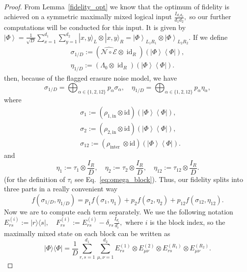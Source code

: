 \documentclass[11pt,letterpaper]{article}
\theoremstyle{plain}
\theoremstyle{plain}
\theoremstyle{plain}
\theoremstyle{plain}
\theoremstyle{plain}
\theoremstyle{plain}
\theoremstyle{plain}
\theoremstyle{definition}
\theoremstyle{plain}
\begin{document}
\begin{proof}
From Lemma~\ref{fidelity_opt} we know that the optimum of fidelity is achieved on a symmetric maximally mixed logical input
$
    \frac{I_{d_1 d_2}}{d_1 d_2},
$
so our further computations will be conducted for this input. 
It is given by
$
    \left|\Phi\right\rangle=\frac{1}{\sqrt{D}} \sum_{x=1}^{d_1} \sum_{y=1}^{d_2}|x, y\rangle_L \otimes|x, y\rangle_R=\left|\Phi\right\rangle_{L_1 R_1} \otimes\left|\Phi\right\rangle_{L_2 R_2}.
$
If we define
\[
    \begin{gathered}
    \sigma_{1/D}:=\left(\widehat{\mathcal{N} \circ \mathcal{E}} \otimes \operatorname{id}_R\right)\left(\left|\Phi\right\rangle\left\langle\Phi\right|\right), \\
    \eta_{1/D}:=\left(\Lambda_0 \otimes \operatorname{id}_R\right)\left(\left|\Phi\right\rangle\left\langle\Phi\right|\right) .
    \end{gathered}
\]
then, because of the flagged erasure noise model, we have
\[
    \sigma_{1/D}=\bigoplus_{\alpha \in\{1,2,12\}} p_\alpha \sigma_\alpha, \quad \eta_{1/D}=\bigoplus_{\alpha \in\{1,2,12\}} p_\alpha \eta_\alpha,
\]
where 
\[
    \begin{aligned}
    & \sigma_1:=\left(\rho_{1, \text {in}} \otimes \mathrm{id}\right)\left(\left|\Phi\right\rangle\left\langle\Phi\right|\right), \\
    & \sigma_2:=\left(\rho_{2, \text {in}} \otimes \mathrm{id}\right)\left(\left|\Phi\right\rangle\left\langle\Phi\right|\right), \\
    & \sigma_{12}:=\left(\rho_{\text {inter }}\otimes \mathrm{id}\right)\left(\left|\Phi\right\rangle\left\langle\Phi\right|\right) .
    \end{aligned}
\]
and
\[
    \eta_1:=\tau_1 \otimes \frac{I_R}{D}, \quad \eta_2:=\tau_2 \otimes \frac{I_R}{D}, \quad \eta_{12}:=\tau_{12} \otimes \frac{I_R}{D}.
\]
(for the definition of $\tau_i$ see Eq.~\eqref{eq:omega_block}). Thus, our fidelity splits into three parts in a really convenient way
\[
    f\left(\sigma_{1/D}, \eta_{1/D}\right)=p_1 f\left(\sigma_1, \eta_1\right)+p_2 f\left(\sigma_2, \eta_2\right)+p_{12} f\left(\sigma_{12}, \eta_{12}\right).
\]
Now we are to compute each term separately. We use the following notation
$
    E_{r s}^{(i)}:=|r\rangle\langle s|, \quad F_{r s}^{(i)}:=E_{r s}^{(i)}-\delta_{r s} \frac{I_{d_i}}{d_i},
$ 
where $i$ is the block index, so the maximally mixed state on each block can be written as
$$
    |\Phi\rangle\langle\Phi|=\frac{1}{D} \sum_{r, s=1}^{d_1} \sum_{\mu, \nu=1}^{d_2} E_{r s}^{(1)} \otimes E_{\mu \nu}^{(2)} \otimes E_{r s}^{\left(R_1\right)} \otimes E_{\mu \nu}^{\left(R_2\right)}.
$$
\end{proof}
\end{document}
